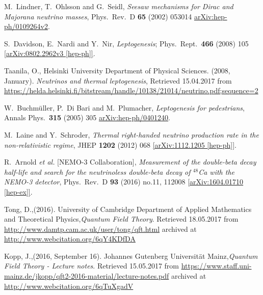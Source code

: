 \begin{thebibliography}{56}
M.~Lindner, T.~Ohlsson and G.~Seidl,
\textit{Seesaw mechanisms for Dirac and Majorana neutrino masses},
Phys.\ Rev.\ D {\textbf{ 65}} (2002) 053014
\href{https://arxiv.org/abs/hep-ph/0109264v2}{arXiv:hep-ph/0109264v2}.

S.~Davidson, E.~Nardi and Y.~Nir,
\textit{Leptogenesis};
Phys.\ Rept.\  {\textbf{466}} (2008) 105
\href{https://arxiv.org/abs/0802.2962v3}{[arXiv:0802.2962v3 [hep-ph]]}.

Taanila, O., Helsinki University Department of Physical Sciences. (2008, January). \textit{Neutrinos and thermal leptogenesis}, Retrieved 15.04.2017 from \href{https://helda.helsinki.fi/bitstream/handle/10138/21014/neutrino.pdf;sequence=2}{https://helda.helsinki.fi/bitstream/handle/10138/21014/neutrino.pdf;sequence=2}

W.~Buchm\"uller, P.~Di Bari and M.~Plumacher,
\textit{Leptogenesis for pedestrians},
Annals Phys.\  {\textbf{315}} (2005) 305
\href{https://arxiv.org/abs/hep-ph/0401240v1}{arXiv:hep-ph/0401240}.

M.~Laine and Y.~Schroder,
\textit{Thermal right-handed neutrino production rate in the non-relativistic regime},
JHEP {\textbf{1202}} (2012) 068
\href{https://arxiv.org/abs/1112.1205v2}{[arXiv:1112.1205 [hep-ph]]}.

R.~Arnold {\textit{et al.}} [NEMO-3 Collaboration],
\textit{Measurement of the double-beta decay half-life and search for the neutrinoless double-beta decay of $^{48}$Ca with the NEMO-3 detector},
Phys.\ Rev.\ D {\textbf{93}} (2016) no.11,  112008
\href{https://arxiv.org/abs/1604.01710}{[arXiv:1604.01710 [hep-ex]]}.

Tong, D.,(2016). University of Cambridge Department of Applied Mathematics and Theoretical Physics,\textit{Quantum Field Theory}.  Retrieved
18.05.2017 from \href{http://www.damtp.cam.ac.uk/user/tong/qft.html}{http://www.damtp.cam.ac.uk/user/tong/qft.html} archived at
\href{http://www.webcitation.org/6qY4KDfDA}{http://www.webcitation.org/6qY4KDfDA}

Kopp, J.,(2016, September 16). Johannes Gutenberg Universität Mainz,\textit{Quantum Field Theory - Lecture notes}.  Retrieved
15.05.2017 from \href{https://www.staff.uni-mainz.de/jkopp/qft2-2016-material/lecture-notes.pdf}{https://www.staff.uni-mainz.de/jkopp/qft2-2016-material/lecture-notes.pdf} archived at
\href{http://www.webcitation.org/6qTuXgadV}{http://www.webcitation.org/6qTuXgadV}


\end{thebibliography}
